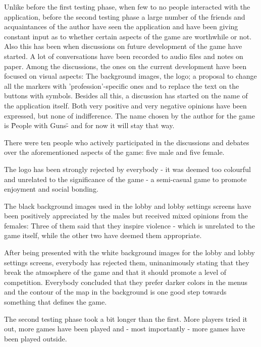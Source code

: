 \documentclass{article}
\begin{document}
Unlike before the first testing phase, when few to no people interacted with
the application, before the second testing phase a large number of the friends
and acquaintances of the author have seen the application and have been giving
constant input as to whether certain aspects of the game are worthwhile or not.
Also this has been when discussions on future development of the game have
started. A lot of conversations have been recorded to audio files and notes on
paper. Among the discussions, the ones on the current development have been
focused on visual aspects: The background images, the logo; a proposal to change
all the markers with 'profession'-specific ones and to replace the text on the
buttons with symbols. Besides all this, a discussion has started on the name of
the application itself. Both very positive and very negative opinions have been
expressed, but none of indifference. The name chosen by the author for the game
is \"People with Guns\" - and for now it will stay that way.\newline

There were ten people who actively participated in the discussions and debates
over the aforementioned aspects of the game: five male and five female.\newline

The logo has been strongly rejected by everybody - it was deemed too colourful
and unrelated to the significance of the game - a semi-casual game to promote
enjoyment and social bonding.\newline

The black background images used in the lobby and lobby settings screens have
been positively appreciated by the males but received mixed opinions from the
females: Three of them said that they inspire violence - which is unrelated
to the game itself, while the other two have deemed them appropriate.\newline

After being presented with the white background images for the lobby and lobby
settings screens, everybody has rejected them, uninanimously stating that they
break the atmosphere of the game and that it should promote a level of
competition. Everybody concluded that they prefer darker colors in the menus and
the contour of the map in the background is one good step towards something that
defines the game.\newline

The second testing phase took a bit longer than the first. More players tried it
out, more games have been played and - most importantly - more games have been
played outside.\newline
\end{document}
